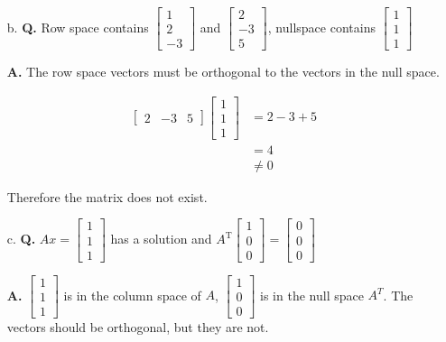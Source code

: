 \documentclass[main.tex]{subfiles}
\begin{document}
\begin{enumerate}
\begin{enumerate}
        \item [b.] \textbf{Q.} Row space contains $\left[\begin{array}{c}1 \\ 2 \\ -3\end{array}\right]$ and $\left[\begin{array}{c}2 \\ -3 \\ 5\end{array}\right]$, nullspace contains $\left[\begin{array}{l}1 \\ 1 \\ 1\end{array}\right]$ 
        
        \textbf{A.}
        The row space vectors must be orthogonal to the vectors in the null space.
        
        $$
        \begin{aligned}
        {\left[\begin{array}{lll}
        2 & -3 & 5
        \end{array}\right]\left[\begin{array}{l}
        1 \\
        1 \\
        1
        \end{array}\right] } &=2-3+5 \\
        &=4 \\
        & \neq 0
        \end{aligned}
        $$
        
        Therefore the matrix does not exist.
        
        \item [c.] \textbf{Q.} $A x=\left[\begin{array}{l}1 \\ 1 \\ 1\end{array}\right]$ has a solution and $A^{\mathrm{T}}\left[\begin{array}{l}1 \\ 0 \\ 0\end{array}\right]=\left[\begin{array}{l}0 \\ 0 \\ 0\end{array}\right]$ 
        
        \textbf{A.} $\left[\begin{array}{l}1 \\ 1 \\ 1\end{array}\right]$ is in the column space of $A$, $\left[\begin{array}{l}1 \\ 0 \\ 0\end{array}\right]$ is in the null space $A^T$. The vectors should be orthogonal, but they are not.
        

\end{enumerate}
\end{enumerate}
\end{document}
